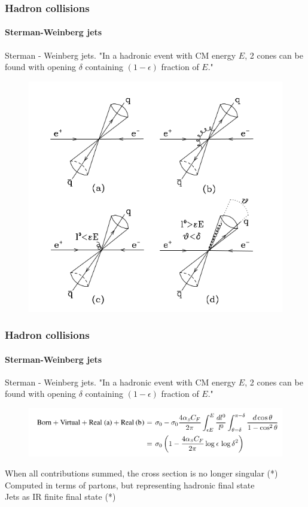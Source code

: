 \documentclass[aspectratio=43]{beamer}
\begin{document}
\begin{frame}

	\frametitle{Hadron collisions}
	\framesubtitle{Sterman-Weinberg jets}
	
	Sterman - Weinberg jets. "In a hadronic event with CM energy $E$, 2 cones can be found with opening $\delta$ containing $(1 - \epsilon)$ fraction of $E$."
	
	\begin{figure}
		\includegraphics[width = 7 cm]{plots/SW_jets.png}
	\end{figure}

\end{frame}

\begin{frame}

	\frametitle{Hadron collisions}
	\framesubtitle{Sterman-Weinberg jets}
	
	Sterman - Weinberg jets. "In a hadronic event with CM energy $E$, 2 cones can be found with opening $\delta$ containing $(1 - \epsilon)$ fraction of $E$."
	
	\begin{figure}
		\includegraphics[width = 12 cm]{plots/eq_SW_jets.png}
	\end{figure}

	When all contributions summed, the cross section is no longer singular {\color{red}(*)} \\
	Computed in terms of partons, but representing hadronic final state \\
	Jets as IR finite final state {\color{red}(*)}
	
\end{frame}
\end{document}
